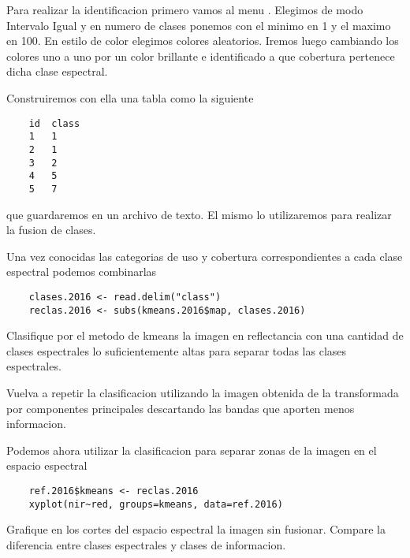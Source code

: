 \documentclass[a4paper]{article}
\begin{document}
Para realizar la identificacion primero vamos al menu . Elegimos de modo
Intervalo Igual y en numero de clases ponemos con el minimo en 1 y el maximo en
100. En estilo de color elegimos colores aleatorios. Iremos luego cambiando los
colores uno a uno por un color brillante e identificado a que cobertura
pertenece dicha clase espectral.

Construiremos con ella una tabla como la siguiente

\begin{verbatim}
    id  class
    1   1
    2   1
    3   2
    4   5
    5   7
\end{verbatim}

que guardaremos en un archivo de texto. El mismo lo utilizaremos para realizar
la fusion de clases.

Una vez conocidas las categorias de uso y cobertura correspondientes a cada
clase espectral podemos combinarlas

\begin{lstlisting}
    clases.2016 <- read.delim("class")
    reclas.2016 <- subs(kmeans.2016$map, clases.2016)
\end{lstlisting}

\begin{act}
    Clasifique por el metodo de kmeans la imagen en reflectancia con una
    cantidad de clases espectrales lo suficientemente altas para separar todas
    las clases espectrales.
\end{act}

\begin{act}
    Vuelva a repetir la clasificacion utilizando la imagen obtenida de la
    transformada por componentes principales descartando las bandas que aporten
    menos informacion.
\end{act}

Podemos ahora utilizar la clasificacion para separar zonas de la imagen en el
espacio espectral

\begin{lstlisting}
    ref.2016$kmeans <- reclas.2016
    xyplot(nir~red, groups=kmeans, data=ref.2016)
\end{lstlisting}

\begin{act}
    Grafique en los cortes del espacio espectral la imagen sin fusionar. Compare
    la diferencia entre clases espectrales y clases de informacion.
\end{act}
\end{document}
